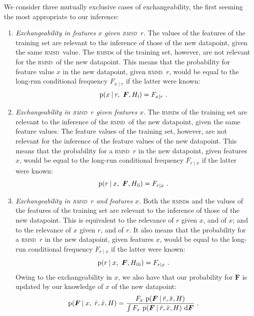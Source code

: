 \documentclass[\ifafour a4paper,12pt,\else a5paper,10pt,\fi%
onecolumn,oneside,article,%
british%
]{memoir}
\makeatletter
\theoremstyle{remark}
\theoremstyle{innote}
\newcommand*{\di}{\mathrm{d}}%
\newcommand*{\p}{\mathrm{p}}%
\renewcommand*{\|}[1][]{\nonscript\:#1\vert\nonscript\:\mathopen{}}
\renewcommand*{\=}{\TextOrMath\texteq\eq}
\newcommand*{\q}{}%
\DeclareRobustCommand*{\q}{%
  \mathord{\mathpalette\bigcdot@{}}%
}
\newcommand*{\bigcdot@scalefactor}{0.7}
\newcommand*{\bigcdot@widthfactor}{1.5}
\newcommand*{\bigcdot@}[2]{%
  \sbox0{$#1\vcenter{}$}%
  \sbox2{$#1\cdot\m@th$}%
  \hbox to \bigcdot@widthfactor\wd2{%
    \hfil
    \raise\ht0\hbox{%
      \scalebox{\bigcdot@scalefactor}{%
        \lower\ht0\hbox{$#1\bullet\m@th$}%
      }%
    }%
    \hfil
  }%
}
\newcommand*{\rmsd}{\textsc{rmsd}}
\newcommand*{\ro}{r}
\newcommand*{\xo}{x}
\newcommand*{\rd}{\bar{r}}
\newcommand*{\xd}{\bar{x}}
\newcommand*{\yF}{\bm{F}}
\makeatother
\begin{document}
We consider three mutually exclusive cases of exchangeability, the first
seeming the most appropriate to our inference:
\begin{enumerate}[label=\roman*.]
\item\label{item:exch_xr}\emph{Exchangeability in features $x$ given \rmsd\
    $r$}. The values of the features of the training set are relevant to
  the inference of those of the new datapoint, given the same \rmsd\ value.
  The \rmsd s of the training set, however, are not relevant for the \rmsd\
  of the new datapoint. This means that the probability for feature value
  $\xo$ in the new datapoint, given \rmsd\ $\ro$, would be equal to the
  long-run conditional frequency $F_{\xo\mid\ro}$ if the latter were known:
  \begin{equation}
    \label{eq:p_xr_F}
    \p(\xo \| \ro,\ \yF, H_{\textrm{i}}) = F_{\xo\mid\ro} \ .
  \end{equation}

\item\label{item:exch_rx}\emph{Exchangeability in \rmsd\ $r$ given features
    $x$}. The \rmsd s of the training set are relevant to the inference of
  the \rmsd\ of the new datapoint, given the same feature values. The
  feature values of the training set, however, are not relevant for the
  inference of the feature values of the new datapoint. This means that the
  probability for a \rmsd\ $\ro$ in the new datapoint, given features
  $\xo$, would be equal to the long-run conditional frequency
  $F_{\ro\mid\xo}$ if the latter were known:
  \begin{equation}
    \label{eq:p_rx_F}
    \p(\ro \| \xo,\ \yF, H_{\textrm{ii}}) = F_{\ro\mid\xo} \ .
  \end{equation}

\item\label{item:exch_full}\emph{Exchangeability in \rmsd\ $r$ and features
    $x$}. Both the \rmsd s and the values of the features of the training
  set are relevant to the inference of those of the new datapoint. This is
  equivalent to the relevance of $r$ given $x$, and of $x$; and to the
  relevance of $x$ given $r$, and of $r$. It also means that the
  probability for a \rmsd\ $\ro$ in the new datapoint, given features
  $\xo$, would be equal to the long-run conditional frequency
  $F_{\ro\mid\xo}$ if the latter were known:
  \begin{equation}
    \label{eq:p_full_F}
    \p(\ro \| \xo,\ \yF, H_{\textrm{iii}}) = F_{\ro\mid\xo} \ .
  \end{equation}
  Owing to the exchangeability in $x$, we also have that our probability
  for $\yF$ is updated by our knowledge of $\xo$ of the new datapoint:
  \begin{equation}
    \label{eq:F_update_xo}
    \p(\yF \| \xo,\ \rd, \xd, H) =
    \frac{F_{\q\xo}\ \p(\yF \| \rd, \xd, H)}{
    \int F_{\q\xo}\ \p(\yF \| \rd, \xd, H)\ \di\yF} \ .
  \end{equation}
\end{enumerate}
\end{document}
